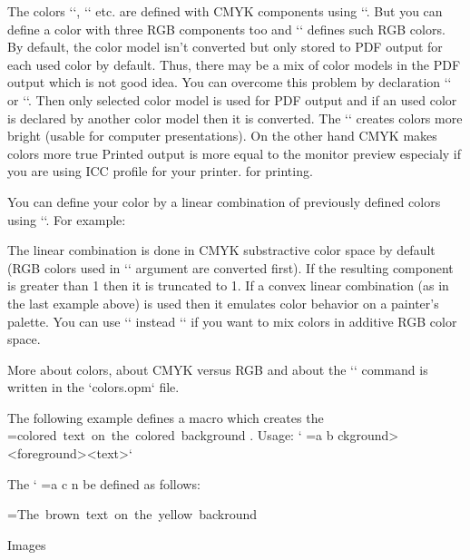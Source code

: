 {The colors `\Blue`, `\Cyan` etc. are defined with CMYK components using `\setcmykcolor`.
But you can define a color with three RGB components too and `\morecolors`
defines such RGB colors. By default, the color model isn't converted but only stored to
PDF output for each used color by default. Thus, there may be a mix of color
models in the PDF output which is not good idea. You can overcome this
problem by declaration `\onlyrgb` or `\onlycmyk`. Then only selected color
model is used for PDF output and if an used color is declared by another color
model then it is converted.
The `\onlyrgb` creates colors more bright (usable for computer
presentations). On the other hand CMYK makes colors more true\fnote
{Printed output is more equal to the monitor preview especialy if you are
using ICC profile for your printer.} 
for printing.

\new
You can define your color by a linear combination of previously defined colors using
``. For example:

\begtt
{} \myCyan {.3\Green + .5\Blue}  %
 \DarkBlue {\Blue + .4\Black}  %
 \myGreen{\Cyan+\Yellow}       %
{} \MyColor {.3\Orange+.5\Green+.2\Yellow}
\endtt
%
The linear combination is done in CMYK substractive color space by default 
(RGB colors used in `` argument are converted first). 
If the resulting component is greater than 1 then it is truncated to 1.
If a convex linear combination (as in the last example above) is used then it
emulates color behavior on a painter's palette.
You can use `\rgbcolordef` instead `` if you want to mix colors 
in additive RGB color space.

More about colors, about CMYK versus RGB and
about the `` command is written in the `colors.opm` file.

\def\coloron#1#2#3{%
   \setbox0=\hbox{#3}\leavevmode
   {\localcolor\rlap{#1\strut \vrule width\wd0}#2}%
}
The following example defines a macro which creates the
\coloron\Yellow\Brown{colored text on the colored background}. Usage:
`\coloron<background><foreground>{<text>}`

The `\coloron` can be defined as follows:

\begtt
\def\coloron#1#2#3{%
   \setbox0=\hbox{#3}\leavevmode
   {\rlap{#1\strut \vrule width\wd0}#2}%
}
\coloron\Yellow\Brown{The brown text on the yellow backround}
\endtt

\secc Images

}
